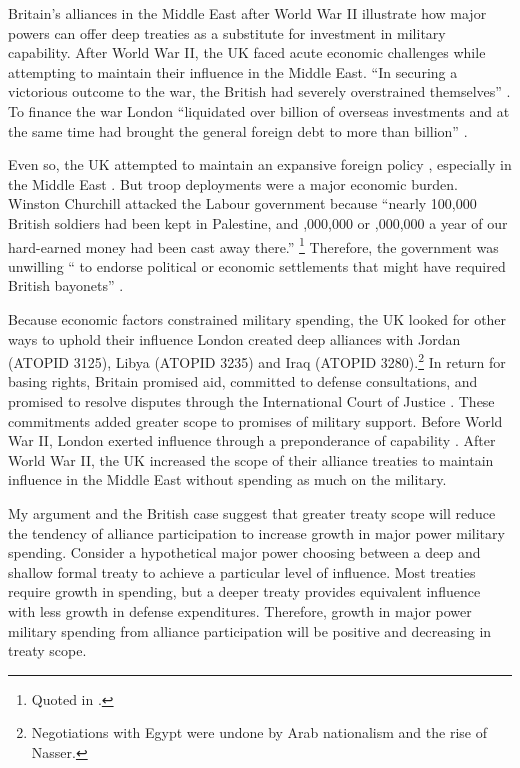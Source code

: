 \documentclass[12pt]{article}
\begin{document}
Britain's alliances in the Middle East after World War II illustrate how major powers can offer deep treaties as a substitute for investment in military capability. 
After World War II, the UK faced acute economic challenges while attempting to maintain their influence in the Middle East. 
``In securing a victorious outcome to the war, the British had severely overstrained themselves'' \citep[pg. 367]{Kennedy1987}. 
To finance the war London ``liquidated over  billion of overseas investments and at the same time had brought the general foreign debt to more than  billion'' \citep[pg. 12]{Louis1984}.
 

Even so, the UK attempted to maintain an expansive foreign policy \citep{Mayhew1950}, especially in the Middle East \citep{Rahman1982}. 
But troop deployments were a major economic burden. 
Winston Churchill attacked the Labour government because ``nearly 100,000 British soldiers had been kept in Palestine, and ,000,000 or ,000,000 a year of our hard-earned money had been cast away there.''
\footnote{Quoted in \citet[pg. 11]{Louis1984}.}
Therefore, the government was unwilling `` to endorse political or economic settlements that might have required British bayonets'' \citep[pg. 15]{Louis1984}. 


Because economic factors constrained military spending, the UK looked for other ways to uphold their influence \citep{Monroe1963, Louis1984}
London created deep alliances with Jordan (ATOPID 3125), Libya (ATOPID 3235) and Iraq (ATOPID 3280).\footnote{Negotiations with Egypt were undone by Arab nationalism and the rise of Nasser.} 
In return for basing rights, Britain promised aid, committed to defense consultations, and promised to resolve disputes through the International Court of Justice \citep{Leedsetal2002}. 
These commitments added greater scope to promises of military support. 
Before World War II, London exerted influence through a preponderance of capability \citep{Monroe1963}.
After World War II, the UK increased the scope of their alliance treaties to maintain influence in the Middle East without spending as much on the military. 


My argument and the British case suggest that greater treaty scope will reduce the tendency of alliance participation to increase growth in major power military spending.
Consider a hypothetical major power choosing between a deep and shallow formal treaty to achieve a particular level of influence.  
Most treaties require growth in spending, but a deeper treaty provides equivalent influence with less growth in defense expenditures. 
Therefore, growth in major power military spending from alliance participation will be positive and decreasing in treaty scope. 
\end{document}

